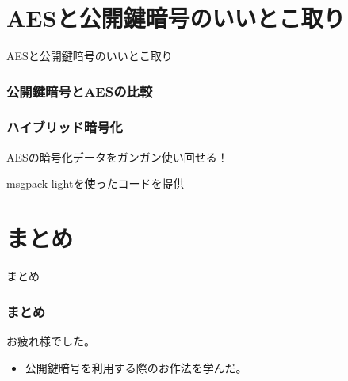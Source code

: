 \documentclass[12pt,dvipdfmx]{beamer}
\begin{document}
\section{AESと公開鍵暗号のいいとこ取り}
\begin{frame}
\centering
{\Large AESと公開鍵暗号のいいとこ取り}
\end{frame}

\begin{frame}
\frametitle{公開鍵暗号とAESの比較}
\end{frame}

\begin{frame}
\frametitle{ハイブリッド暗号化}
AESの暗号化データをガンガン使い回せる！

msgpack-lightを使ったコードを提供
\end{frame}

\begin{frame}
\end{frame}


\section{まとめ}
\begin{frame}
 \centering
 {\Large まとめ}
\end{frame}

\begin{frame}
\frametitle{まとめ}
お疲れ様でした。

\begin{itemize}
\item 公開鍵暗号を利用する際のお作法を学んだ。
\end{itemize}
\end{frame}




\end{document}
